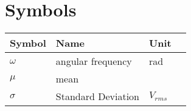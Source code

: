 %
        \chapter{Symbols} \label{app_symbols}%

\begin{tabular}{l l l p{5cm} } %
	\textbf{Symbol} & \textbf{Name}      & \textbf{Unit} \\ \hline

	$\omega$        & angular frequency  & \si{\radian}  \\
	\addlinespace
	$\mu$           & mean               & \(\)          \\
	\addlinespace
	$\sigma$        & Standard Deviation & \(V_{rms}\)   \\
\end{tabular}

%